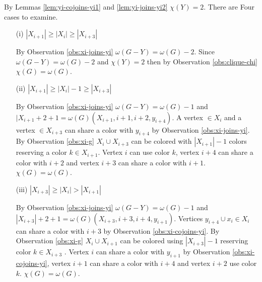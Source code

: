 \documentclass[12pt]{article}
\begin{document}
\begin{minipage}{0.5\textwidth}%
	 By Lemmas \ref{lem:yi-cojoins-yi1} and \ref{lem:yi-joins-yi2} $\chi(Y) = 2$. There are Four cases to examine.
	\begin{itemize}
	\item[(i)]
		$|X_{i+1}| \geq |X_i| \geq |X_{i+3}|$

		By Observation \ref{obs:xi-joins-yi} $\omega(G - Y) = \omega(G) - 2$. Since $\omega(G - Y) = \omega(G) - 2$ and $\chi(Y) = 2$ then by Observation \ref{obs:clique-chi} $\chi(G) = \omega(G)$. 

	\item[(ii)]
		$|X_{i+1}| \geq |X_i| - 1 \geq |X_{i+3}|$

		By Observation \ref{obs:xi-joins-yi} $\omega(G - Y) = \omega(G) - 1$ and $|X_{i+1} + 2 + 1 = \omega(G) (X_{i+1}, i+1, i+2, y_{i+4})$. A vertex $\in X_i$ and a vertex $\in X_{i+3}$ can share a color with $y_{i+4}$ by Observation \ref{obs:xi-joins-yi}. By Observation \ref{obs:xi-g} $X_i \cup X_{i+3}$ can be colored with $|X_{i+1}| - 1$ colors reserving a color $k \in X_{i+1}$. Vertex $i$ can use color $k$, vertex $i+4$ can share a color with $i+2$ and vertex $i+3$ can share a color with $i+1$. $\chi(G) = \omega(G)$.

	\item[(iii)]
		$|X_{i+3}| \geq |X_{i}| > |X_{i+1}|$

		By Observation \ref{obs:xi-joins-yi} $\omega(G - Y) = \omega(G) - 1$ and $|X_{i+3}| + 2 + 1 = \omega(G) (X_{i+3}, i+3, i+4, y_{i+1})$. Vertices $y_{i+4} \cup x_i \in X_i$ can share a color with $i+3$ by Observation \ref{obs:xi-cojoins-yi}. By Observation \ref{obs:xi-g} $X_{i} \cup X_{i+1}$ can be colored using $|X_{i+3}| - 1$ reserving color $k \in X_{i+3}$ . Vertex $i$ can share a color with $y_{i+1}$ by Observation \ref{obs:xi-cojoins-yi}, vertex $i+1$ can share a color with $i+4$ and vertex $i+2$ use color $k$. $\chi(G) = \omega(G)$.

	\end{itemize}
\end{minipage}
\hfill
\end{document}
